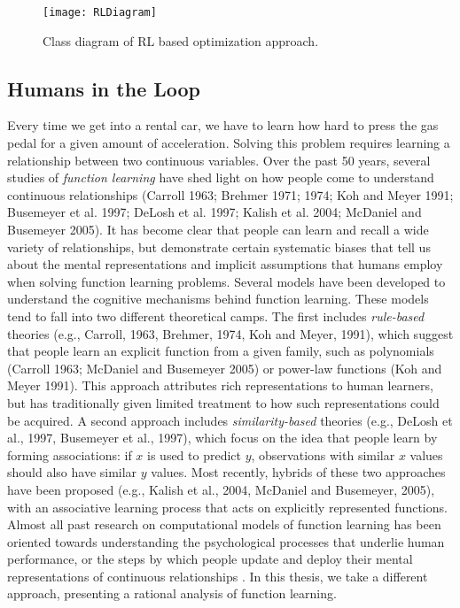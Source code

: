 \begin{figure} [h!]
	\texttt{[image: RLDiagram]}
	\caption{Class diagram of RL based optimization approach.}
	\label{fig:RLUMLDiagram}
\end{figure}

\subsection{Humans in the Loop} Every time we get into a rental car, we have to learn how hard to press the gas pedal for a given amount of
acceleration. Solving this problem requires learning a relationship between two continuous variables. Over the past 50 years, several studies of \textit{function learning} have shed light on how people come to understand continuous relationships (Carroll 1963; Brehmer 1971; 1974; Koh and Meyer 1991; Busemeyer et al. 1997; DeLosh et al. 1997; Kalish et al. 2004; McDaniel and Busemeyer 2005). It has become clear that people can learn and recall a wide variety of relationships,
but demonstrate certain systematic biases that tell
us about the mental representations and implicit assumptions that humans employ when solving function learning problems. Several models have been developed to understand the cognitive mechanisms behind function learning. These
models tend to fall into two different theoretical camps. The first includes \textit{rule-based} theories (e.g., Carroll, 1963, Brehmer, 1974, Koh and Meyer, 1991), which suggest that people learn an explicit function from a given family, such as polynomials (Carroll 1963; McDaniel and Busemeyer 2005) or power-law functions (Koh and Meyer 1991). This approach attributes rich representations to human learners, but has traditionally given limited treatment to how such representations could be acquired. A second approach includes \textit{similarity-based} theories (e.g., DeLosh et al., 1997, Busemeyer et al., 1997), which focus on the idea that people learn by forming associations: if $x$ is used to predict $y$, observations with similar $x$ values should also have similar $y$ values. Most recently, hybrids of these two approaches have been proposed (e.g., Kalish et al., 2004, McDaniel and Busemeyer, 2005), with an associative learning process that acts on explicitly represented functions. Almost all past research on computational models of function learning has been oriented towards understanding the psychological processes that underlie human performance, or the steps by which people update and deploy
their mental representations of continuous relationships \cite{Lucas2015}. In this thesis, we take a different approach, presenting a rational analysis of function learning. \\

